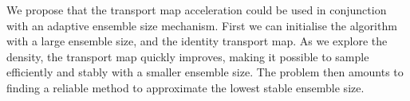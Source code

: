 \documentclass[final]{siamltex}
\begin{document}
We propose that the transport map acceleration could be used in
conjunction with an adaptive ensemble size mechanism. First we can
initialise the algorithm with a large ensemble size, and the identity transport map. As
we explore the density, the transport map quickly improves, making it
possible to sample efficiently and stably with a smaller ensemble
size. The problem then amounts to finding a reliable method to
approximate the lowest stable ensemble size.





\end{document}
